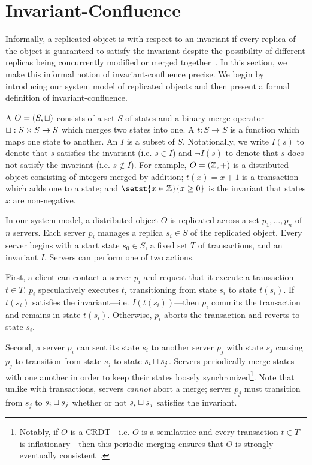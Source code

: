 \section{Invariant-Confluence}
Informally, a replicated object is  with respect
to an invariant if every replica of the object is guaranteed to satisfy the
invariant despite the possibility of different replicas being concurrently
modified or merged together~\cite{bailis2014coordination}. In this section, we
make this informal notion of invariant-confluence precise. We begin by
introducing our system model of replicated objects and then present a formal
definition of invariant-confluence.

A  $O = (S, \sqcup)$ consists of a set $S$ of
states and a binary merge operator $\sqcup: S \times S \to S$ which merges two
states into one. A  $t: S \to S$ is a function which maps
one state to another. An  $I$ is a subset of $S$.
Notationally, we write $I(s)$ to denote that $s$ satisfies the invariant (i.e.
$s \in I$) and $\lnot I(s)$ to denote that $s$ does not satisfy the invariant
(i.e. $s \notin I$).
%
For example, $O = (\mathbb{Z}, +)$ is a distributed object consisting of integers
merged by addition; $t(x) = x + 1$ is a transaction which adds one to a state;
and $\setst{x \in \ints}{x \geq 0}$ is the invariant that states $x$ are
non-negative.

In our system model, a distributed object $O$ is replicated across a set $p_1,
\ldots, p_n$ of $n$ servers. Each server $p_i$ manages a replica $s_i \in S$ of
the replicated object. Every server begins with a start state $s_0 \in S$, a
fixed set $T$ of transactions, and an invariant $I$. Servers can perform one of
two actions.

First, a client can contact a server $p_i$ and request that it execute a
transaction $t \in T$. $p_i$ speculatively executes $t$, transitioning from
state $s_i$ to state $t(s_i)$. If $t(s_i)$ satisfies the invariant---i.e.
$I(t(s_i))$---then $p_i$ commits the transaction and remains in state $t(s_i)$.
Otherwise, $p_i$ aborts the transaction and reverts to state $s_i$.

Second, a server $p_i$ can sent its state $s_i$ to another server $p_j$ with
state $s_j$ causing $p_j$ to transition from state $s_j$  to state $s_i \sqcup
s_j$. Servers periodically merge states with one another in order to keep their
states loosely synchronized\footnote{%
  Notably, if $O$ is a CRDT---i.e. $O$ is a semilattice and every transaction
  $t \in T$ is inflationary---then this periodic merging ensures that $O$ is
  strongly eventually consistent~\cite{shapiro2011conflict}.
}.
Note that unlike with transactions, servers \emph{cannot} abort a merge; server
$p_j$ must transition from $s_j$ to $s_i \sqcup s_j$ whether or not $s_i \sqcup
s_j$ satisfies the invariant.

